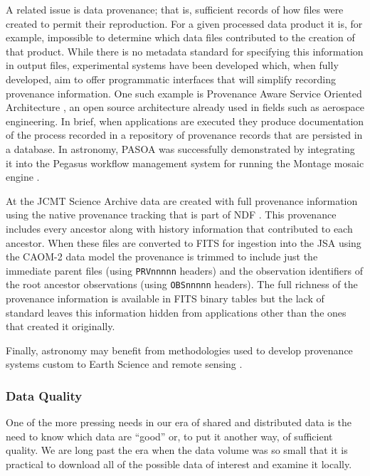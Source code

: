 \documentclass[final,authoryear,5p,times,twocolumn]{elsarticle}
\begin{document}
{{A related issue is data provenance; that is, sufficient records of how files
were created to permit their reproduction. For a given processed data product
it is, for example, impossible to determine which data files
contributed to the creation of that product. While there is no metadata standard
for specifying this
information in output files, experimental systems have been developed which, when fully developed,
aim to offer programmatic interfaces that will
simplify recording provenance information. One such example is
Provenance Aware Service Oriented Architecture
\citep[PASOA;][]{2008IPAWMoreau,2011743Moreau}, an open source architecture
already used in fields such as aerospace engineering. In brief, when
applications are executed they produce documentation of the process recorded
in a repository of provenance records that are persisted in a database. In
astronomy, PASOA was successfully demonstrated by integrating it into the
Pegasus workflow management system for running the Montage mosaic engine
\citep{2009SCGroth}.


At the JCMT Science Archive \citep[JSA;][]{2008ASPC..394..135G,2014Economou} data are
created with full provenance information using the native provenance
tracking that is part of NDF \citep{2009ASPC..411..418J}. This
provenance includes every ancestor along with history information that
contributed to each ancestor. When these files are converted to FITS
for ingestion into the JSA using the CAOM-2 data model
\citep{2013ASPC..475..159R} the provenance is trimmed to include
just the immediate parent files (using \texttt{PRVnnnnn} headers)
and the observation identifiers of the root ancestor observations
(using \texttt{OBSnnnnn} headers). The full richness of the provenance
information is available in FITS binary tables but the lack of standard
leaves this information hidden from applications other than the ones
that created it originally.

Finally, astronomy may benefit from methodologies used to develop provenance
systems custom to Earth Science and remote sensing
\citep{2008IPAWTilmes,2008IPAWMcCann}.


\subsubsection{Data Quality}


One of the more pressing needs in our era of shared and distributed
data is the need to know which data are ``good'' or, to put it another
way, of sufficient quality. We are long past the era when the data
volume was so small that it is practical to download all of the possible
data of interest and examine it locally.


}}
\end{document}
